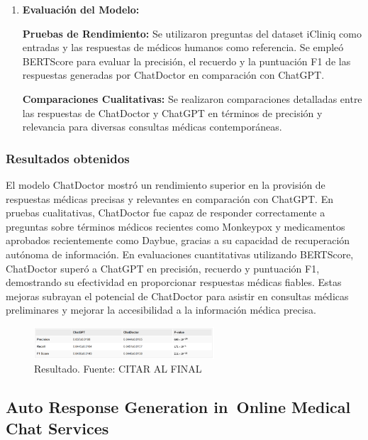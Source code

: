 \begin{enumerate}
		\item \textbf{Evaluación del Modelo:}
			
			\subitem \textbf{Pruebas de Rendimiento:} Se utilizaron preguntas del dataset iCliniq como entradas y las respuestas de médicos humanos como referencia. Se empleó BERTScore para evaluar la precisión, el recuerdo y la puntuación F1 de las respuestas generadas por ChatDoctor en comparación con ChatGPT.
			
			\subitem \textbf{Comparaciones Cualitativas:} Se realizaron comparaciones detalladas entre las respuestas de ChatDoctor y ChatGPT en términos de precisión y relevancia para diversas consultas médicas contemporáneas.
	\end{enumerate}

\subsubsection{Resultados obtenidos}
	El modelo ChatDoctor mostró un rendimiento superior en la provisión de respuestas médicas precisas y relevantes en comparación con ChatGPT. En pruebas cualitativas, ChatDoctor fue capaz de responder correctamente a preguntas sobre términos médicos recientes como Monkeypox y medicamentos aprobados recientemente como Daybue, gracias a su capacidad de recuperación autónoma de información. En evaluaciones cuantitativas utilizando BERTScore, ChatDoctor superó a ChatGPT en precisión, recuerdo y puntuación F1, demostrando su efectividad en proporcionar respuestas médicas fiables. Estas mejoras subrayan el potencial de ChatDoctor para asistir en consultas médicas preliminares y mejorar la accesibilidad a la información médica precisa.

\begin{figure}[h]
	\begin{center}
		\includegraphics[width=0.6\textwidth]{2/1_antecedentes/Resultado-7.png}
		\caption{Resultado. Fuente: CITAR AL FINAL }
	\end{center}
\end{figure}



\subsection{Auto Response Generation in Online Medical Chat Services} %
